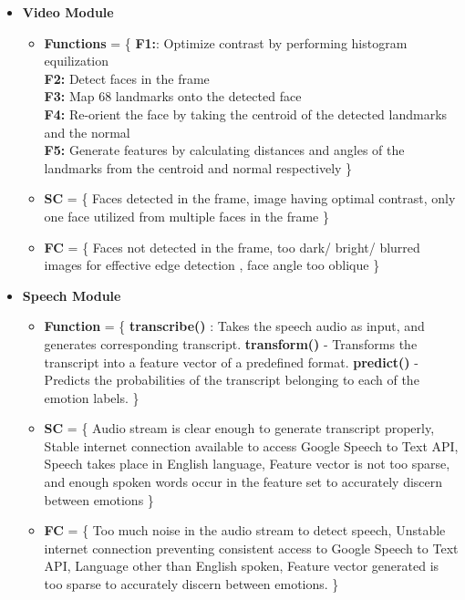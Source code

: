 \documentclass[oneside,a4paper,12pt]{report}
\begin{document}
\begin{normalsize}
\begin{itemize}
\begin{itemize}
\begin{itemize}
		
		\item \textbf{Video Module}\\
		\begin{itemize}
			\item \textbf{Functions} = \{ \textbf{F1:}: Optimize contrast by performing histogram equilization \\ \textbf{F2:} Detect faces in the frame \\ \textbf{F3:} Map 68 landmarks onto the detected face \\ \textbf{F4:} Re-orient the face by taking the centroid of the detected landmarks and the normal \\ \textbf{F5:} Generate features by calculating distances and angles of the landmarks from the centroid and normal respectively \}\newline
			\item \textbf{SC} = \{ Faces detected in the frame, image having optimal contrast, only one face utilized from  multiple faces in the frame \}\newline
			\item \textbf{FC} = \{ Faces not detected in the frame, too dark/ bright/ blurred images for effective edge detection , face angle too oblique \}\newline
		\end{itemize}
		\vspace{4mm}
		\item \textbf{Speech Module}\\
			\begin{itemize}
			\item \textbf{Function} = \{ \textbf{transcribe()} : Takes the speech audio as input, and generates corresponding transcript.
			\textbf{transform()} - Transforms the transcript into a feature vector of a predefined format.
			\textbf{predict()} - Predicts the probabilities of the transcript belonging to each of the emotion labels. \}
			\newline
			\item \textbf{SC} = \{ Audio stream is clear enough to generate transcript properly, Stable internet connection available to access Google Speech to Text API,  Speech takes place in English language, Feature vector is not too sparse, and enough spoken words occur in the feature set to accurately discern between emotions \}
			\newline
			\item \textbf{FC} = \{ Too much noise in the audio stream to detect speech, Unstable internet connection preventing consistent access to Google Speech to Text API, Language other than English spoken, Feature vector generated is too sparse to accurately discern between emotions.  \}

\end{itemize}
\end{itemize}
\end{itemize}
\end{itemize}
\end{normalsize}
\end{document}
